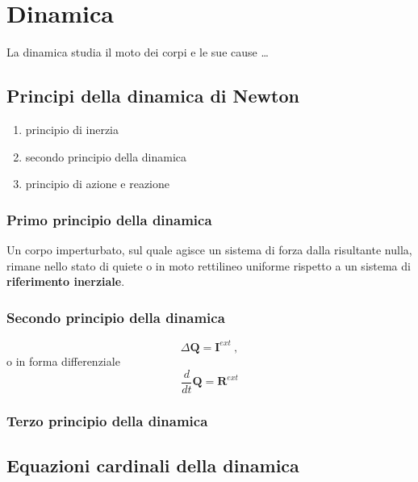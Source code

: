 \chapter{Dinamica}\label{mechanics:dynamics}
La dinamica studia il moto dei corpi e le sue cause \dots
\section{Principi della dinamica di Newton}
\begin{enumerate}
  \item principio di inerzia
  \item secondo principio della dinamica
  \item principio di azione e reazione
\end{enumerate}
\subsection{Primo principio della dinamica}
Un corpo imperturbato, sul quale agisce un sistema di forza dalla risultante nulla, rimane nello stato di quiete o in moto rettilineo uniforme rispetto a un sistema di \textbf{riferimento inerziale}.

\noindent
{\color{red}{Cosa intendiamo per sistema di riferimento inerziale?}}

\subsection{Secondo principio della dinamica}
\begin{equation}
    \Delta \mathbf{Q} = \mathbf{I}^{ext} \ ,
\end{equation}
o in forma differenziale
\begin{equation}
    \dfrac{d}{dt}\mathbf{Q} = \mathbf{R}^{ext}
\end{equation}

\subsection{Terzo principio della dinamica}

\section{Equazioni cardinali della dinamica}
